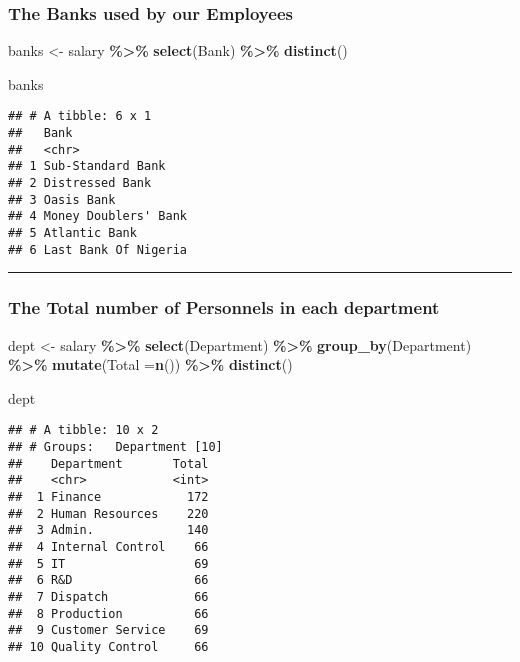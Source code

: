 \documentclass[
]{article}
\newenvironment{Shaded}{\begin{snugshade}}{\end{snugshade}}
\newcommand{\AttributeTok}[1]{\textcolor[rgb]{0.13,0.29,0.53}{#1}}
\newcommand{\FunctionTok}[1]{\textcolor[rgb]{0.13,0.29,0.53}{\textbf{#1}}}
\newcommand{\NormalTok}[1]{#1}
\newcommand{\OtherTok}[1]{\textcolor[rgb]{0.56,0.35,0.01}{#1}}
\newcommand{\SpecialCharTok}[1]{\textcolor[rgb]{0.81,0.36,0.00}{\textbf{#1}}}
\begin{document}
\subsubsection{The Banks used by our
Employees}\label{the-banks-used-by-our-employees}

\begin{Shaded}
\begin{Highlighting}[]
\NormalTok{banks }\OtherTok{\textless{}{-}}\NormalTok{ salary }\SpecialCharTok{\%\textgreater{}\%} 
  \FunctionTok{select}\NormalTok{(Bank) }\SpecialCharTok{\%\textgreater{}\%} 
  \FunctionTok{distinct}\NormalTok{()}

\NormalTok{banks}
\end{Highlighting}
\end{Shaded}

\begin{verbatim}
## # A tibble: 6 x 1
##   Bank                
##   <chr>               
## 1 Sub-Standard Bank   
## 2 Distressed Bank     
## 3 Oasis Bank          
## 4 Money Doublers' Bank
## 5 Atlantic Bank       
## 6 Last Bank Of Nigeria
\end{verbatim}

\begin{center}\rule{0.5\linewidth}{0.5pt}\end{center}

\subsubsection{The Total number of Personnels in each
department}\label{the-total-number-of-personnels-in-each-department}

\begin{Shaded}
\begin{Highlighting}[]
\NormalTok{dept }\OtherTok{\textless{}{-}}\NormalTok{ salary }\SpecialCharTok{\%\textgreater{}\%} 
  \FunctionTok{select}\NormalTok{(Department) }\SpecialCharTok{\%\textgreater{}\%} 
  \FunctionTok{group\_by}\NormalTok{(Department) }\SpecialCharTok{\%\textgreater{}\%} 
  \FunctionTok{mutate}\NormalTok{(}\AttributeTok{Total =}\FunctionTok{n}\NormalTok{()) }\SpecialCharTok{\%\textgreater{}\%}
  \FunctionTok{distinct}\NormalTok{()}

\NormalTok{dept}
\end{Highlighting}
\end{Shaded}

\begin{verbatim}
## # A tibble: 10 x 2
## # Groups:   Department [10]
##    Department       Total
##    <chr>            <int>
##  1 Finance            172
##  2 Human Resources    220
##  3 Admin.             140
##  4 Internal Control    66
##  5 IT                  69
##  6 R&D                 66
##  7 Dispatch            66
##  8 Production          66
##  9 Customer Service    69
## 10 Quality Control     66
\end{verbatim}
\end{document}
